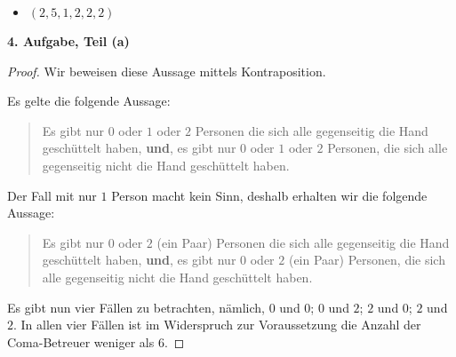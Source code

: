 \documentclass[12pt]{extarticle}
\begin{document}
\begin{itemize}
\begin{center}
  \end{center}
\item \((2,5,1,2,2,2)\)
  \begin{center}
  \end{center}
\end{itemize}

\textbf{4. Aufgabe, Teil (a)}
\begin{proof}
  Wir beweisen diese Aussage mittels Kontraposition.

  Es gelte die folgende Aussage:
  \begin{quote}
    Es gibt nur \(0\) oder \(1\) oder \(2\) Personen die sich alle
    gegenseitig die Hand geschüttelt haben, \textbf{und},
    es gibt nur \(0\) oder \(1\) oder \(2\) Personen, die sich alle
    gegenseitig nicht die Hand geschüttelt haben.
  \end{quote}

  Der Fall mit nur \(1\) Person macht kein Sinn, deshalb erhalten wir
  die folgende Aussage:
  \begin{quote}
    Es gibt nur \(0\) oder \(2\) (ein Paar) Personen die sich alle
    gegenseitig die Hand geschüttelt haben, \textbf{und}, es gibt nur
    \(0\) oder \(2\) (ein Paar) Personen, die sich alle gegenseitig nicht
    die Hand geschüttelt haben.
  \end{quote}

  Es gibt nun vier Fällen zu betrachten, nämlich, \(0\) und \(0\); \(0\) und
  \(2\); \(2\) und \(0\); \(2\) und \(2\).  In allen vier Fällen ist im
  Widerspruch zur Voraussetzung die Anzahl der Coma-Betreuer weniger
  als \(6\).
\end{proof}
\end{document}
